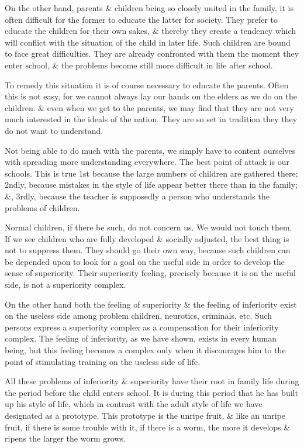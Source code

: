 \documentclass{article}
\begin{document}
On the other hand, parents \& children being so closely united in the family, it is often difficult for the former to educate the latter for society. They prefer to educate the children for their own sakes, \& thereby they create a tendency which will conflict with the situation of the child in later life. Such children are bound to face great difficulties. They are already confronted with them the moment they enter school, \& the problems become still more difficult in life after school.

To remedy this situation it is of course necessary to educate the parents. Often this is not easy, for we cannot always lay our hands on the elders as we do on the children. \& even when we get to the parents, we may find that they are not very much interested in the ideals of the nation. They are so set in tradition they they do not want to understand.

Not being able to do much with the parents, we simply have to content ourselves with spreading more understanding everywhere. The best point of attack is our schools. This is true 1st because the large numbers of children are gathered there; 2ndly, because mistakes in the style of life appear better there than in the family; \&, 3rdly, because the teacher is supposedly a person who understands the problems of children.

Normal children, if there be such, do not concern us. We would not touch them. If we see children who are fully developed \& socially adjusted, the best thing is not to suppress them. They should go their own way, because such children can be depended upon to look for a goal on the useful side in order to develop the sense of superiority. Their superiority feeling, precisely because it is on the useful side, is not a superiority complex.

On the other hand both the feeling of superiority \& the feeling of inferiority exist on the useless side among problem children, neurotics, criminals, etc. Such persons express a superiority complex as a compensation for their inferiority complex. The feeling of inferiority, as we have shown, exists in every human being, but this feeling becomes a complex only when it discourages him to the point of stimulating training on the useless side of life.

All these problems of inferiority \& superiority have their root in family life during the period before the child enters school. It is during this period that he has built up his style of life, which in contrast with the adult style of life we have designated as a prototype. This prototype is the unripe fruit, \& like an unripe fruit, if there is some trouble with it, if there is a worm, the more it develops \& ripens the larger the worm grows.
\end{document}
